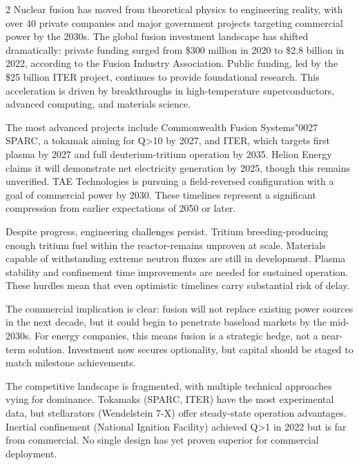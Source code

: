 \documentclass[10pt,a4paper]{article}
\newcommand{\BOApos}{{\BOQuoteFont\char"0027}}
\begin{document}
\begin{multicols}{2}
{\small Nuclear fusion has moved from theoretical physics to engineering reality, with over 40 private companies and major government projects targeting commercial power by the 2030s. The global fusion investment landscape has shifted dramatically: private funding surged from \$300 million in 2020 to \$2.8 billion in 2022, according to the Fusion Industry Association. Public funding, led by the \$25 billion ITER project, continues to provide foundational research. This acceleration is driven by breakthroughs in high-temperature superconductors, advanced computing, and materials science.}\par
{\small The most advanced projects include Commonwealth Fusion Systems\BOApos{} SPARC, a tokamak aiming for Q>10 by 2027, and ITER, which targets first plasma by 2027 and full deuterium-tritium operation by 2035. Helion Energy claims it will demonstrate net electricity generation by 2025, though this remains unverified. TAE Technologies is pursuing a field-reversed configuration with a goal of commercial power by 2030. These timelines represent a significant compression from earlier expectations of 2050 or later.}\par
{\small Despite progress, engineering challenges persist. Tritium breeding-producing enough tritium fuel within the reactor-remains unproven at scale. Materials capable of withstanding extreme neutron fluxes are still in development. Plasma stability and confinement time improvements are needed for sustained operation. These hurdles mean that even optimistic timelines carry substantial risk of delay.}\par
{\small The commercial implication is clear: fusion will not replace existing power sources in the next decade, but it could begin to penetrate baseload markets by the mid-2030s. For energy companies, this means fusion is a strategic hedge, not a near-term solution. Investment now secures optionality, but capital should be staged to match milestone achievements.}\par
{\small The competitive landscape is fragmented, with multiple technical approaches vying for dominance. Tokamaks (SPARC, ITER) have the most experimental data, but stellarators (Wendelstein 7-X) offer steady-state operation advantages. Inertial confinement (National Ignition Facility) achieved Q>1 in 2022 but is far from commercial. No single design has yet proven superior for commercial deployment.}\par
\end{multicols}
\label{chap:1:end}
\end{document}

